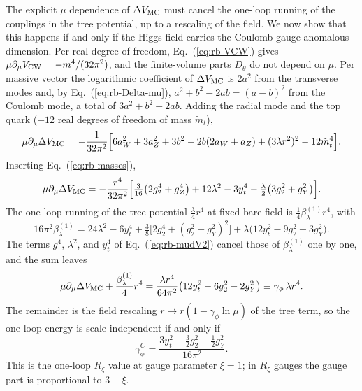 The explicit $\mu$ dependence of $\Delta V_{\rm MC}$ must cancel the one-loop running of the couplings in the tree potential, up to a rescaling of the field.
We now show that this happens if and only if the Higgs field carries the Coulomb-gauge anomalous dimension.
Per real degree of freedom, Eq.~(\ref{eq:rb-VCW}) gives $\mu\partial_\mu V_{\rm CW}=-m^4/(32\pi^2)$, and the finite-volume parts $D_\theta$ do not depend on $\mu$.
Per massive vector the logarithmic coefficient of $\Delta V_{\rm MC}$ is $2a^2$ from the transverse modes and, by Eq.~(\ref{eq:rb-Delta-mu}), $a^2+b^2-2ab=(a-b)^2$ from the Coulomb mode, a total of $3a^2+b^2-2ab$.
Adding the radial mode and the top quark ($-12$ real degrees of freedom of mass $\tilde m_t$),
\begin{equation}
\mu\partial_\mu\Delta V_{\rm MC}=-\frac{1}{32\pi^2}\Bigl[6a_W^2+3a_Z^2+3b^2-2b(2a_W+a_Z)+(3\lambda r^2)^2-12\tilde m_t^4\Bigr].
\label{eq:rb-mudV}
\end{equation}
Inserting Eq.~(\ref{eq:rb-masses}),
\begin{equation}
\mu\partial_\mu\Delta V_{\rm MC}=-\frac{r^4}{32\pi^2}\Bigl[\tfrac{3}{16}\bigl(2g_2^4+g_Z^4\bigr)+12\lambda^2-3y_t^4-\tfrac{\lambda}{2}\bigl(3g_2^2+g_Y^2\bigr)\Bigr].
\label{eq:rb-mudV2}
\end{equation}
The one-loop running of the tree potential $\frac\lambda4r^4$ at fixed bare field is $\frac14\beta_\lambda^{(1)}r^4$, with
\begin{equation}
16\pi^2\beta_\lambda^{(1)}=24\lambda^2-6y_t^4+\tfrac38\bigl[2g_2^4+(g_2^2+g_Y^2)^2\bigr]+\lambda\bigl(12y_t^2-9g_2^2-3g_Y^2\bigr).
\label{eq:rb-betalam}
\end{equation}
The terms $g^4$, $\lambda^2$, and $y_t^4$ of Eq.~(\ref{eq:rb-mudV2}) cancel those of $\beta_\lambda^{(1)}$ one by one, and the sum leaves
\begin{equation}
\mu\partial_\mu\Delta V_{\rm MC}+\frac{\beta_\lambda^{(1)}}{4}r^4=\frac{\lambda r^4}{64\pi^2}\bigl(12y_t^2-6g_2^2-2g_Y^2\bigr)\equiv\gamma_\phi\,\lambda r^4 .
\label{eq:rb-rg}
\end{equation}
The remainder is the field rescaling $r\to r(1-\gamma_\phi\ln\mu)$ of the tree term, so the one-loop energy is scale independent if and only if
\begin{equation}
\gamma_\phi^{C}=\frac{3y_t^2-\frac32g_2^2-\frac12g_Y^2}{16\pi^2}.
\label{eq:rb-gammaC}
\end{equation}
This is the one-loop $R_\xi$ value at gauge parameter $\xi=1$; in $R_\xi$ gauges the gauge part is proportional to $3-\xi$.
